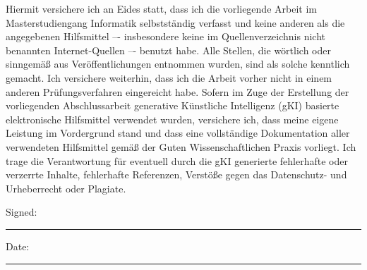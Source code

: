 \documentclass[
11pt, %
english, %
singlespacing, %
headsepline, %
]{MasterThesis} %
\begin{document}

\begin{declaration}
\addchaptertocentry{\authorshipname} %
Hiermit versichere ich an Eides statt, dass ich die vorliegende Arbeit im Masterstudiengang Informatik
selbstständig verfasst und keine anderen als die angegebenen Hilfsmittel –- insbesondere keine im Quellenverzeichnis nicht benannten Internet-Quellen –- benutzt habe. Alle Stellen, die wörtlich oder sinngemäß aus Veröffentlichungen entnommen wurden, sind als solche kenntlich gemacht. Ich versichere weiterhin, dass ich die Arbeit vorher nicht in einem anderen Prüfungsverfahren eingereicht habe. Sofern im Zuge der Erstellung der vorliegenden Abschlussarbeit generative Künstliche Intelligenz (gKI) basierte elektronische Hilfsmittel verwendet wurden, versichere ich, dass meine eigene Leistung im Vordergrund stand und dass eine vollständige Dokumentation aller verwendeten Hilfsmittel gemäß der Guten Wissenschaftlichen Praxis vorliegt. Ich trage die Verantwortung für eventuell durch die gKI generierte fehlerhafte oder verzerrte Inhalte, fehlerhafte Referenzen, Verstöße gegen das Datenschutz- und Urheberrecht oder Plagiate. 
\vspace{1cm}


\noindent Signed:\\
\rule[0.5em]{25em}{0.5pt} %
 
\noindent Date:\\
\rule[0.5em]{25em}{0.5pt} %
\end{declaration}

\cleardoublepage

\end{document}
